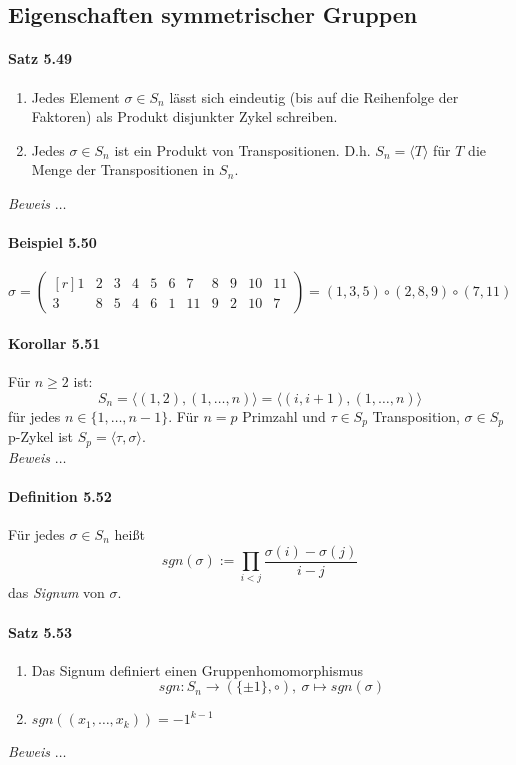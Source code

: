 \documentclass{scrartcl}
\begin{document}
\subsection{Eigenschaften symmetrischer Gruppen}
\label{subsec:eigenschaftensymmetrischergruppen}

\paragraph{Satz 5.49}
\begin{enumerate}
\item Jedes Element $\sigma \in S_n$ lässt sich eindeutig (bis auf die
  Reihenfolge der Faktoren) als Produkt disjunkter Zykel schreiben.
\item Jedes $\sigma \in S_n$ ist ein Produkt von Transpositionen. D.h. $S_n =
  \langle {T} \rangle$ für $T$ die Menge der Transpositionen in $S_n$.
\end{enumerate}
\textit{Beweis} $\dots$

\paragraph{Beispiel 5.50}
\[
  \sigma =
  \begin{pmatrix*}[r]
    1 & 2 & 3 & 4 & 5 & 6 & 7 & 8 & 9 & 10 & 11 \\
    3 & 8 & 5 & 4 & 6 & 1 & 11 & 9 & 2 & 10 & 7
  \end{pmatrix*}
  = (1, 3, 5) \circ (2, 8, 9) \circ (7, 11)
\]

\paragraph{Korollar 5.51}
Für $ n \geq 2$ ist:
\[
  S_n = \langle {(1, 2), (1, \dots, n)} \rangle = \langle {(i, i+1), (1, \dots,
    n)} \rangle
\]
für jedes $n \in \{1, \dots, n - 1\}$. Für $n = p$ Primzahl und $\tau \in S_p$
Transposition, $\sigma \in S_p$ p-Zykel ist $S_p = \langle {\tau, \sigma}
\rangle$. \\
\textit{Beweis} $\dots$

\paragraph{Definition 5.52}
Für jedes $\sigma \in S_n$ heißt
\[
  sgn(\sigma) := \prod_{i < j}\frac{\sigma(i) - \sigma(j)}{i - j}
\]
das \textit{Signum} von $\sigma$.

\paragraph{Satz 5.53}
\begin{enumerate}
\item Das Signum definiert einen Gruppenhomomorphismus
  \[
    sgn: S_n \to (\{\pm 1\}, \circ),~\sigma \mapsto sgn(\sigma)
  \]
\item $sgn((x_1, \dots, x_k)) = -1^{k-1}$
\end{enumerate}
\textit{Beweis} $\dots$
\end{document}
